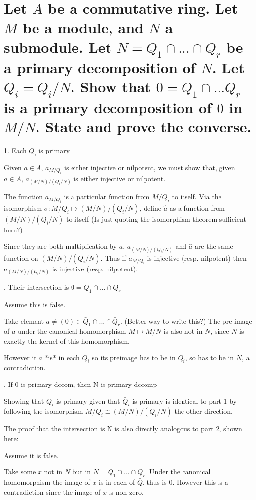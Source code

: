 \documentclass{article}
\begin{document}
\section{Let $A$ be a commutative ring. Let $M$ be a module, and $N$ a submodule. Let $N=Q_1 \cap ... \cap Q_r$ be a primary decomposition of $N$. Let $\bar{Q}_i = Q_i/N$. Show that $0 = \bar{Q}_1 \cap ... \bar{Q}_r$ is a primary decomposition of $0$ in $M/N$. State and prove the converse.}

1. Each $\bar{Q_i}$  is primary

Given $a \in A$, $a_{M/Q_i}$ is either injective or nilpotent, we must show that, given $a \in A$, $a_{ (M/N) / ( Q_i / N)}$ is either injective or nilpotent.

The function $a_{M/Q_i}$ is a particular function from $M/Q_i$ to itself. Via the isomorphism $\sigma: M/Q_i \mapsto (M/N) / ( Q_i / N)$, define $\hat{a}$ as a function from  $(M/N) / ( Q_i / N)$ to itself (Is just quoting the isomorphism theorem sufficient here?)

Since they are both multiplication by $a$, $a_{ (M/N) / ( Q_i / N)}$ and $\hat{a}$ are the same function on  $(M/N) / ( Q_i / N)$. Thus if $a_{M/Q_i}$ is injective (resp. nilpotent) then  $a_{ (M/N) / ( Q_i / N)}$ is injective (resp. nilpotent).

. Their intersection is $0 = \bar{Q}_1 \cap ... \cap \bar{Q}_r$

Assume this is false.

Take element $a \ne (0) \in \bar{Q}_1 \cap ... \cap \bar{Q}_r$. (Better way to write this?) The pre-image of $a$ under the canonical homomorphism $M \mapsto M/N$ is also not in $N$, since $N$ is exactly the kernel of this homomorphism. 

However it $a$ *is* in each $\bar{Q}_i$ so its preimage has to be in $Q_i$, so has to be in $N$, a contradiction.


. If 0 is primary decom, then N is primary decomp

Showing that $Q_i$ is primary given that $\bar{Q}_i$ is primary is identical to part 1 by following the isomorphism $ M / Q_i \cong (M/N)/(Q_i/N)$ the other direction.

The proof that the intersection is N is also directly analogous to part 2, shown here:

Assume it is false.

Take some $x$ not in $N$ but in $N=Q_1 \cap ... \cap Q_r$. Under the canonical homomorphism the image of $x$ is in each of $\bar{Q}$, thus is $0$. However this is a contradiction since the image of $x$ is non-zero.
\end{document}
